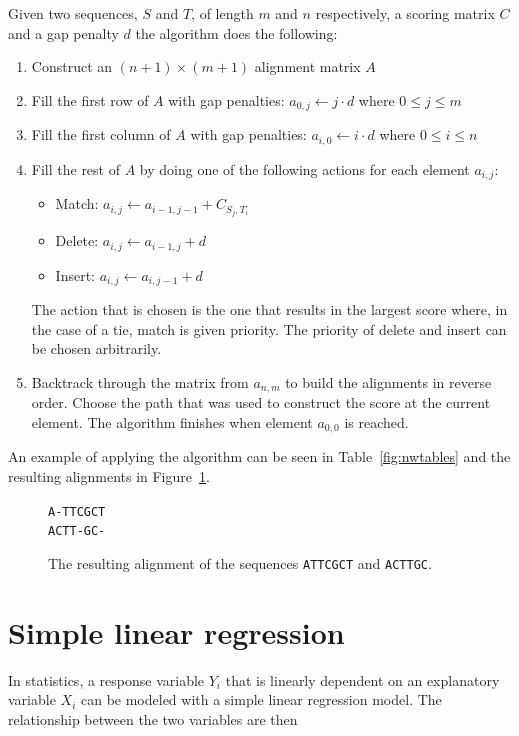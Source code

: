 \documentclass[a4paper]{report}
\begin{document}
Given two sequences, $S$ and $T$, of length $m$ and $n$ respectively, a scoring
matrix $C$ and a gap penalty $d$ the algorithm does the following:

\begin{enumerate}
    \item Construct an $(n + 1) \times (m + 1)$ alignment matrix $A$
    \item Fill the first row of $A$ with gap penalties: $a_{0,j} \gets j \cdot
        d$ where $0 \le j \le m$
    \item Fill the first column of $A$ with gap penalties: $a_{i,0} \gets i
        \cdot d$ where $0 \le i \le n$
    \item Fill the rest of $A$ by doing one of the following actions for each
        element $a_{i,j}$:
        \begin{itemize}
            \item Match: $a_{i,j} \gets a_{i - 1, j - 1} + C_{S_j,T_i}$
            \item Delete: $a_{i,j} \gets a_{i - 1, j} + d$
            \item Insert: $a_{i,j} \gets a_{i, j - 1} + d$
        \end{itemize}
        The action that is chosen is the one that results in the largest score
        where, in the case of a tie, match is given priority. The priority of
        delete and insert can be chosen arbitrarily.
    \item Backtrack through the matrix from $a_{n,m}$ to build the alignments
        in reverse order. Choose the path that was used to construct the score
        at the current element. The algorithm finishes when element $a_{0,0}$
        is reached.
\end{enumerate}

An example of applying the algorithm can be seen in Table~\ref{fig:nwtables}
and the resulting alignments in Figure~\ref{fig:align}.

\begin{figure}[h]
    \centering
    \texttt{A-TTCGCT\\ACTT-GC-}
    \captionsetup{width=0.8\textwidth}
    \caption{The resulting alignment of the sequences \texttt{ATTCGCT} and
    \texttt{ACTTGC}.}
    \label{fig:align}
\end{figure}

\section{Simple linear regression}
In statistics, a response variable $Y_i$ that is linearly dependent on an
explanatory variable $X_i$ can be modeled with a simple linear regression
model. The relationship between the two variables are then
\end{document}
